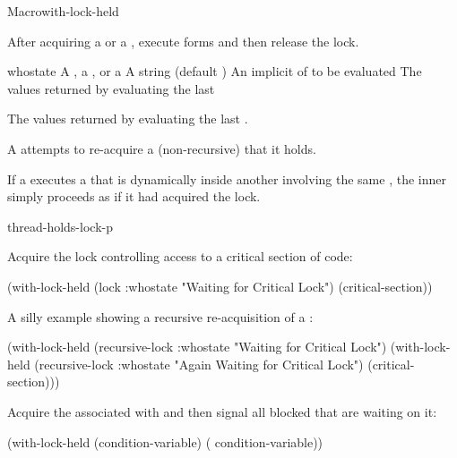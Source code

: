 \documentclass[10pt,twoside,english,pdftex]{article}
\begin{document}
\begin{functiondoc}{Macro}{with-lock-held}{%
    }
%
%
%
%

\fnsyntax

\fnpurpose After acquiring a  or a ,
execute forms and then release the lock.

\fnpackage {}

\fnmodule {}

\fnargs
\begin{args}{whostate}
\arg[lock] A , a , or a 
\arg[whostate] A string (default )
\arg[forms] An implicit  of  to be evaluated
\arg[results] The values returned by evaluating the last 
\end{args}

\fnreturns The values returned by evaluating the last .

\fnerrors A  attempts to re-acquire a (non-recursive)
 that it holds.
  
\fndescription If a  executes a 
that is dynamically inside another  involving
the same , the inner 
simply proceeds as if it had acquired the lock.

\begin{alsos}{thread-holds-lock-p}
\end{alsos}

\fnexamples
Acquire the lock controlling access to a critical section of code:
%
\W\supp
\begin{example}
  (with-lock-held (lock :whostate "Waiting for Critical Lock")
    (critical-section))
\end{example}
%
A silly example showing a recursive re-acquisition of a
:
%
\W\supp\notpretop
\begin{example}
  (with-lock-held (recursive-lock :whostate "Waiting for Critical Lock")
    (with-lock-held (recursive-lock :whostate "Again Waiting for Critical Lock")
      (critical-section)))
\end{example}
%
%
%
Acquire the  associated with  and
then signal all blocked  that are waiting on it:
%
\W\supp\notpretop
\begin{example}
  (with-lock-held (condition-variable)
    ( condition-variable))
\end{example}


\end{functiondoc}
\end{document}
